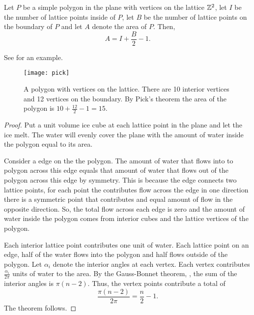\begin{theorem}\label{thm:pick}
Let $P$ be a simple polygon in the plane with vertices on the lattice $\mathbb{Z}^2$,
let $I$ be the number of lattice points inside of $P$, let $B$ be the number
of lattice points on the boundary of $P$ and let $A$ denote the area of $P$.
Then, 
$$A=I+\frac{B}{2}-1.$$
\end{theorem}
See  for an example.

 \begin{figure}[htb]
         \centering
         \texttt{[image: pick]}
	\caption{A polygon with vertices on the lattice. 
	There are 10 interior vertices and 12 vertices on the boundary.
	By Pick's theorem the area of the polygon is $10+\frac{12}{2}-1=15.$
	\label{fig:picks}}
 \end{figure}
 
\begin{proof}
	Put a unit volume ice cube at each lattice point in the plane and let the ice melt.
	The water will evenly cover the plane with the amount of water inside the polygon 
	equal to its area.
	
	Consider a edge on the the polygon. The amount of water that flows
	into to polygon across this edge equals that amount of water that flows out of the polygon
	across this edge by symmetry. This is because the edge connects two lattice points,
	for each point the contributes flow across the edge in one direction there is a symmetric
	point that contributes and equal amount of flow in the opposite direction.
	So, the total flow across each edge is zero and
	the  amount of water inside the polygon comes from interior cubes and the lattice vertices
	of the polygon.
	
	Each interior lattice point contributes one unit of water. 
	Each lattice point on an edge, half of the water flows into the polygon and
	half flows outside of the polygon.
	Let $\alpha_i$ denote the interior angles at each vertex.
	Each vertex contributes $\frac{\alpha_i}{2\pi}$ units of water to the area.
	By the Gauss-Bonnet theorem, , the sum of the interior
	angles is $\pi(n-2)$. Thus, the vertex points contribute a total of 
	$$\frac{\pi(n-2)}{2\pi}=\frac{n}{2}-1.$$
	The theorem follows.

\end{proof}




